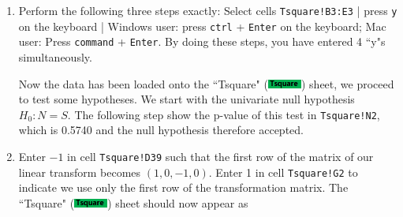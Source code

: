 \documentclass[article]{jss}
\newcommand{\shtTsquare}{``Tsquare" (\includegraphics[height=8pt, keepaspectratio=true]{TsquareSheetTab_png}) }
\begin{document}
\begin{enumerate}
                \begin{figure}[!tbh]      
                        \includegraphics[width=\linewidth, keepaspectratio=true]{img/TsquareSheetAfterPaste_markup}
                        \centering{}\protect\caption{Tsquare sheet: initial setup.}
                \end{figure}
                
                \item Perform the following three steps exactly: Select cells \texttt{Tsquare!B3:E3} | press \texttt{y} on the keyboard | Windows user: press \texttt{ctrl} + \texttt{Enter} on the keyboard; Mac user: Press \texttt{command} + \texttt{Enter}. By doing these steps, you have entered 4 ``y"s simultaneously.
                
                
                
                Now the data has been loaded onto the \shtTsquare sheet, we proceed to test some hypotheses. We start with the univariate null hypothesis $H_0: N = S$. The following step show the p-value of this test in \texttt{Tsquare!N2}, which is 0.5740 and the null hypothesis therefore accepted.
                \item Enter $-1$ in cell \texttt{Tsquare!D39} such that the first row of the matrix of our linear transform becomes $(1,0,-1,0)$. Enter 1 in cell \texttt{Tsquare!G2} to indicate we use only the first row of the transformation matrix. The \shtTsquare sheet should now appear as
                

\end{enumerate}
\end{document}
